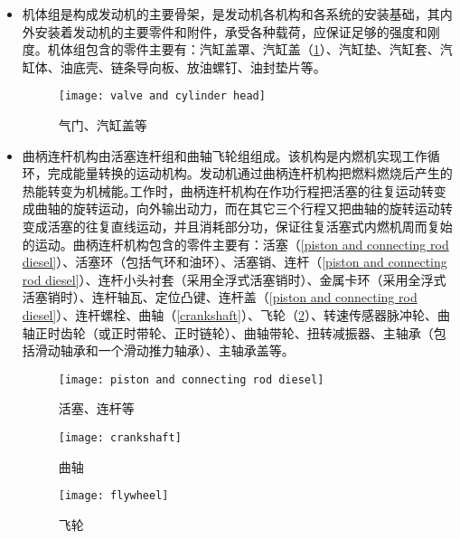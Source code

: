 \documentclass[UTF8]{ctexart}
\numberwithin{figure}{section}
\numberwithin{table}{section}
\begin{document}
\begin{itemize}
	\item 机体组是构成发动机的主要骨架，是发动机各机构和各系统的安装基础，其内外安装着发动机的主要零件和附件，承受各种载荷，应保证足够的强度和刚度。机体组包含的零件主要有：汽缸盖罩、汽缸盖（\cref{valve and cylinder head}）、汽缸垫、汽缸套、汽缸体、油底壳、链条导向板、放油螺钉、油封垫片等。

	      \begin{figure}[htbp]
		      \centering
		      \begin{minipage}[b]{0.4\textwidth}
			      \centering
			      \texttt{[image: valve and cylinder head]}
			      \caption{气门、汽缸盖等}
			      \label{valve and cylinder head}
		      \end{minipage}
	      \end{figure}

	\item 曲柄连杆机构由活塞连杆组和曲轴飞轮组组成。该机构是内燃机实现工作循环，完成能量转换的运动机构。发动机通过曲柄连杆机构把燃料燃烧后产生的热能转变为机械能｡工作时，曲柄连杆机构在作功行程把活塞的往复运动转变成曲轴的旋转运动，向外输出动力，而在其它三个行程又把曲轴的旋转运动转变成活塞的往复直线运动，并且消耗部分功，保证往复活塞式内燃机周而复始的运动。曲柄连杆机构包含的零件主要有：活塞（\cref{piston and connecting rod diesel}）、活塞环（包括气环和油环）、活塞销、连杆（\cref{piston and connecting rod diesel}）、连杆小头衬套（采用全浮式活塞销时）、金属卡环（采用全浮式活塞销时）、连杆轴瓦、定位凸键、连杆盖（\cref{piston and connecting rod diesel}）、连杆螺栓、曲轴（\cref{crankshaft}）、飞轮（\cref{flywheel}）、转速传感器脉冲轮、曲轴正时齿轮（或正时带轮、正时链轮）、曲轴带轮、扭转减振器、主轴承（包括滑动轴承和一个滑动推力轴承）、主轴承盖等。

	      \begin{figure}[htbp]
		      \centering
		      \begin{minipage}[b]{0.25\textwidth}
			      \centering
			      \texttt{[image: piston and connecting rod diesel]}
			      \caption{活塞、连杆等}
			      \label{piston and connecting rod diesel}
		      \end{minipage}
		      \begin{minipage}[b]{0.45\textwidth}
			      \centering
			      \texttt{[image: crankshaft]}
			      \caption{曲轴}
			      \label{crankshaft}
		      \end{minipage}
		      \begin{minipage}[b]{0.25\textwidth}
			      \centering
			      \texttt{[image: flywheel]}
			      \caption{飞轮}
			      \label{flywheel}
		      \end{minipage}
	      \end{figure}


\end{itemize}
\end{document}
